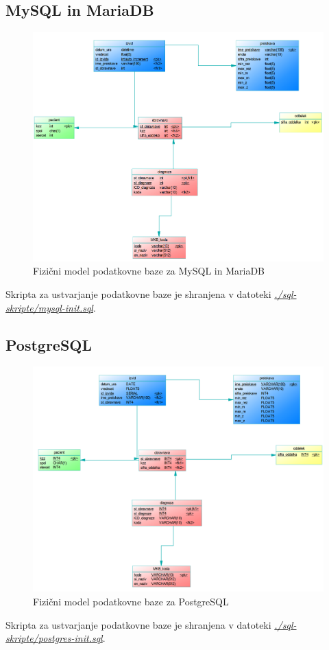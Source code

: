 \documentclass[a4paper,11pt]{report}
\begin{document}
\subsection{MySQL in MariaDB}
\begin{figure}[htb]
   \noindent\includegraphics[width=\linewidth]{./pics/fizicni-mysql.png}
   \caption{Fizični model podatkovne baze za MySQL in MariaDB}
\end{figure}
Skripta za ustvarjanje podatkovne baze je shranjena v datoteki \textit{\underline{./sql-skripte/mysql-init.sql}}.
\pagebreak
\subsection{PostgreSQL}
\begin{figure}[htb]
   \noindent\includegraphics[width=\linewidth]{./pics/fizicni-postgres.png}
   \caption{Fizični model podatkovne baze za PostgreSQL}
\end{figure}
Skripta za ustvarjanje podatkovne baze je shranjena v datoteki \textit{\underline{./sql-skripte/postgres-init.sql}}.
\end{document}
